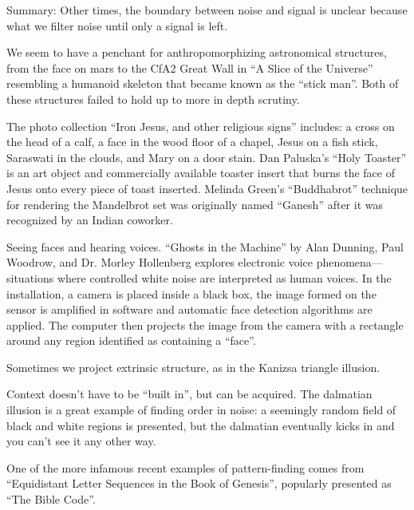 \documentclass{thesis}
\begin{document}
Summary: Other times, the boundary between noise and signal is unclear because what we filter noise until only a signal is left.

We seem to have a penchant for anthropomorphizing astronomical structures, from the face on mars\cite{brian_dunning_facemars_2008} to the CfA2 Great Wall in ``A Slice of the Universe''\cite{de_lapparent_slice_1986} resembling a humanoid skeleton that became known as the ``stick man''. Both of these structures failed to hold up to more in depth scrutiny.

The photo collection ``Iron Jesus, and other religious signs''\cite{boston.com_religious_????} includes: a cross on the head of a calf, a face in the wood floor of a chapel, Jesus on a fish stick, Saraswati in the clouds, and Mary on a door stain. Dan Paluska's ``Holy Toaster''\cite{dan_paluska_holy_2005} is an art object and commercially available toaster insert that burns the face of Jesus onto every piece of toast inserted. Melinda Green's ``Buddhabrot''\cite{melinda_green_buddhabrot_1993} technique for rendering the Mandelbrot set was originally named ``Ganesh'' after it was recognized by an Indian coworker.

Seeing faces and hearing voices. ``Ghosts in the Machine'' by Alan Dunning, Paul Woodrow, and Dr. Morley Hollenberg\cite{alan_dunning_paul_woodrow_and_morley_hollenberg_einsteins_2008} explores electronic voice phenomena---situations where controlled white noise are interpreted as human voices. In the installation, a camera is placed inside a black box, the image formed on the sensor is amplified in software and automatic face detection algorithms are applied. The computer then projects the image from the camera with a rectangle around any region identified as containing a ``face''.

Sometimes we project extrinsic structure, as in the Kanizsa\cite{alexander_bogomolny_kanizsa_????} triangle illusion.

Context doesn't have to be ``built in'', but can be acquired. The dalmatian illusion\cite{michael_bach_dalmatian_2002} is a great example of finding order in noise: a seemingly random field of black and white regions is presented, but the dalmatian eventually kicks in and you can't see it any other way.

One of the more infamous recent examples of pattern-finding comes from ``Equidistant Letter Sequences in the Book of Genesis''\cite{rips_equidistant_1994}, popularly presented as ``The Bible Code''.
\end{document}
